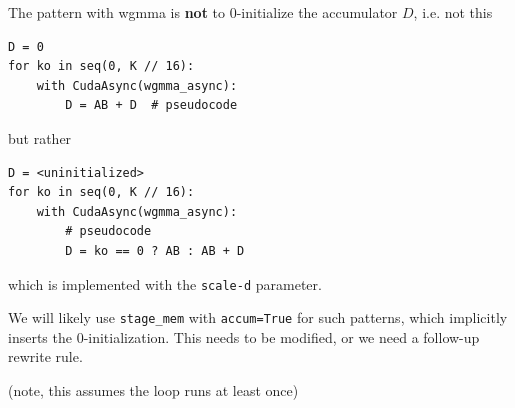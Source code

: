\begin{minipage}[t]{0.48\textwidth}\fixminipage
{}

The pattern with wgmma is \textbf{not} to 0-initialize the accumulator $D$, i.e. not this
\begin{verbatim}
D = 0
for ko in seq(0, K // 16):
    with CudaAsync(wgmma_async):
        D = AB + D  # pseudocode
\end{verbatim}
but rather
\begin{verbatim}
D = <uninitialized>
for ko in seq(0, K // 16):
    with CudaAsync(wgmma_async):
        # pseudocode
        D = ko == 0 ? AB : AB + D
\end{verbatim}
which is implemented with the \texttt{scale-d} parameter.

We will likely use \texttt{stage\_mem} with \texttt{accum=True} for such patterns, which implicitly inserts the 0-initialization.
This needs to be modified, or we need a follow-up rewrite rule.

(note, this assumes the loop runs at least once)
\end{minipage}

